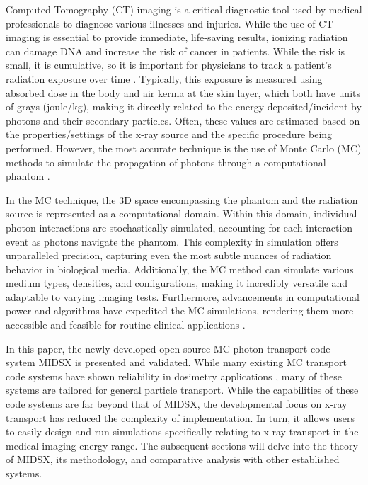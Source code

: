 \par Computed Tomography (CT) imaging is a critical diagnostic tool used by medical professionals to diagnose various illnesses and injuries. While the use of CT imaging is essential to provide immediate, life-saving results, ionizing radiation can damage DNA and increase the risk of cancer in patients. While the risk is small, it is cumulative, so it is important for physicians to track a patient's radiation exposure over time \cite{lauer2009elements}. Typically, this exposure is measured using absorbed dose in the body and air kerma at the skin layer, which both have units of grays (joule/kg), making it directly related to the energy deposited/incident by photons and their secondary particles. Often, these values are estimated based on the properties/settings of the x-ray source and the specific procedure being performed. However, the most accurate technique is the use of Monte Carlo (MC) methods to simulate the propagation of photons through a computational phantom \cite{essmedphys2012}. 
\par In the MC technique, the 3D space encompassing the phantom and the radiation source is represented as a computational domain. Within this domain, individual photon interactions are stochastically simulated, accounting for each interaction event as photons navigate the phantom. This complexity in simulation offers unparalleled precision, capturing even the most subtle nuances of radiation behavior in biological media. Additionally, the MC method can simulate various medium types, densities, and configurations, making it incredibly versatile and adaptable to varying imaging tests. Furthermore, advancements in computational power and algorithms have expedited the MC simulations, rendering them more accessible and feasible for routine clinical applications \cite{fernandez_bosman_validation_2021}.
\par In this paper, the newly developed open-source MC photon transport code system MIDSX is presented and validated. While many existing MC transport code systems have shown reliability in dosimetry applications \cite{fernandez_bosman_validation_2021, geant4valid2004}, many of these systems are tailored for general particle transport. While the capabilities of these code systems are far beyond that of MIDSX, the developmental focus on x-ray transport has reduced the complexity of implementation. In turn, it allows users to easily design and run simulations specifically relating to x-ray transport in the medical imaging energy range. The subsequent sections will delve into the theory of MIDSX, its methodology, and comparative analysis with other established systems.

